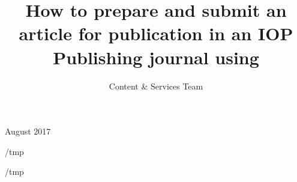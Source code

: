 \documentclass[12pt]{iopart}
\def\overleafhome{/tmp}%
\begin{document}
\title[Author guidelines for IOP Publishing journals in  \LaTeXe]{How to prepare and submit an article for
publication in an IOP Publishing journal using \LaTeXe}

\author{Content \& Services Team}

\address{IOP Publishing, Temple Circus, Temple Way, Bristol BS1 6HG, UK}
\vspace{10pt}
\begin{indented}
\item[]August 2017
\end{indented}

\ifx\homepath\overleafhome
  
\else
  
\fi

\ifx\homepath\overleafhome %
  
  
  
  
  
  
\else %
  
  
  
  
  
  
\fi



%


\appendix
\end{document}
